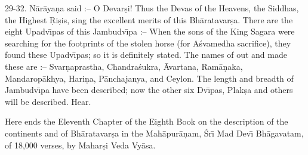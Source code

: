 29-32. N\=ar\=aya\d{n}a said :-- O Devar\d{s}i! Thus the Devas of the Heavens, the Siddhas, the Highest \d{R}i\d{s}is, sing the excellent merits of this Bh\=aratavar\d{s}a. There are the eight Upadv\={\i}pas of this Jambudv\={\i}pa :-- When the sons of the King Sagara were searching for the footprints of the stolen horse (for A\'svamedha sacrifice), they found these Upadv\={\i}pas; so it is definitely stated. The names of out and made these are :-- Svar\d{n}aprastha, Chandra\'sukra, \=Avartana, Ram\=a\d{n}aka, Mandarop\=akhya, Hari\d{n}a, P\=anchajanya, and Ceylon. The length and breadth of Jambudv\={\i}pa have been described; now the other six Dv\={\i}pas, Plak\d{s}a and others will be described. Hear.

Here ends the Eleventh Chapter of the Eighth Book on the description of the continents and of Bh\=aratavar\d{s}a in the Mah\=apur\=a\d{n}am, \'Sr\={\i} Mad Dev\={\i} Bh\=agavatam, of 18,000 verses, by Mahar\d{s}i Veda Vy\=asa.



